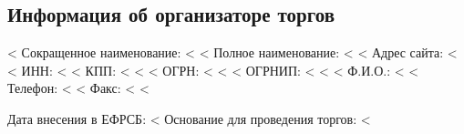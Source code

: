 \documentclass[a4paper,12pt]{article}
\begin{document}
{{{{{{{	\subsection*{Информация об организаторе торгов}
        <%
            {\color{Gray} Сокращенное наименование:} <%
            \linebreak
        <%
        {\color{Gray} Полное наименование:} <%
        \linebreak
        <%
            {\color{Gray} Адрес сайта:} <%
        	\linebreak
        <%
        {\color{Gray} ИНН:} <%
        \linebreak
        <%
            {\color{Gray} КПП:} <%
        	\linebreak
        <%
        <%
            {\color{Gray} ОГРН:} <%
        	\linebreak
        <%
        <%
            {\color{Gray} ОГРНИП:} <%
        	\linebreak
        <%
        <%
            {\color{Gray} Ф.И.О.:} <%
        	\linebreak
        <%
        {\color{Gray} Телефон:} <%
    	\linebreak
        <%
            {\color{Gray} Факс:} <%
        	\linebreak
        <%

    {\color{Gray} Дата внесения в ЕФРСБ:} <%
    \linebreak
    {\color{Gray} Основание для проведения торгов:} <%
    \linebreak

}}}}}}}
\end{document}
